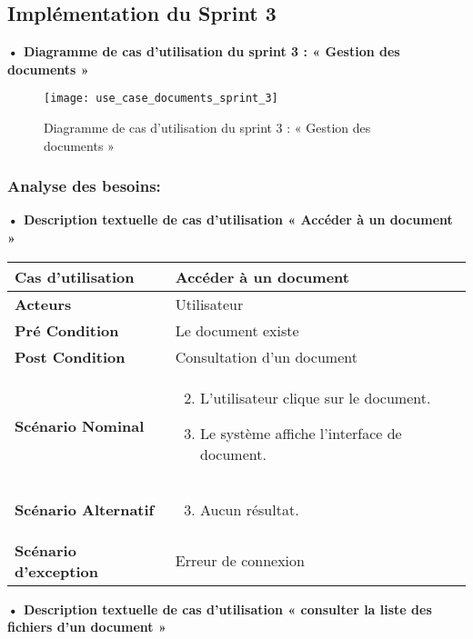 \subsection{Implémentation du Sprint 3}
\textbf{•	Diagramme de cas d'utilisation du sprint 3 : « Gestion des documents »}

\begin{figure}[H]
  \centering
  \texttt{[image: use\_case\_documents\_sprint\_3]}
  \caption{Diagramme de cas d'utilisation du sprint 3 : « Gestion des documents »}
  \label{fig:UseCaseDiagramSprint3}
\end{figure}


\subsubsection{Analyse des besoins:}
\textbf{•	Description textuelle de cas d'utilisation « Accéder à un document »}

\begin{longtable}{|p{5cm}|p{10cm}|}
\hline
\textbf{Cas d'utilisation}&Accéder à un document\\
\hline
\textbf{Acteurs}&Utilisateur\\
\hline
\textbf{Pré Condition}&Le document existe\\
\hline
\textbf{Post Condition}&Consultation d'un document\\
\hline
\textbf{Scénario Nominal}&
\vspace{-\baselineskip}
\begin{enumerate}
    \setcounter{enumi}{1}
    \item L'utilisateur clique sur le document.
    \item Le système affiche l'interface de document.
    
\end{enumerate}\\
\hline
\textbf{Scénario Alternatif}&
\vspace{-\baselineskip}
\begin{enumerate}
    \setcounter{enumi}{2}
    \item Aucun résultat.
\end{enumerate}\\
\hline
\textbf{Scénario d'exception}&Erreur de connexion\\
\hline
\end{longtable}


\textbf{•	Description textuelle de cas d'utilisation « consulter la liste des fichiers d'un document »}


